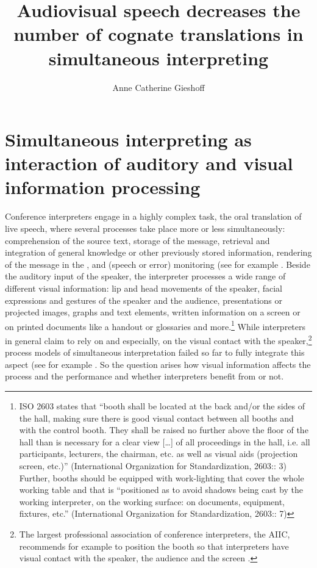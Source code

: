 \documentclass[output=paper]{LSP/langsci}
\title{Audiovisual speech decreases the number of cognate translations in simultaneous interpreting}
\author{Anne Catherine Gieshoff\affiliation{FTSK Germersheim, Johannes-Gutenberg-Universtität Mainz}}
\begin{document}
\section{Simultaneous interpreting as interaction of auditory and visual information processing}
\largerpage%
Conference interpreters engage in a highly complex task, the oral translation of live speech, where several processes take place more or less simultaneously: comprehension of the source text, storage of the message, retrieval and integration of general knowledge or other previously stored information, rendering of the message in the , and (speech or error) monitoring (see for example \citealt{Seeber2012, Gile2009, Setton1999, Gerver1975}. Beside the auditory input of the speaker, the interpreter processes a wide range of different visual information: lip and head movements of the speaker, facial expressions and gestures of the speaker and the audience, presentations or projected images, graphs and text elements, written information on a screen or on printed documents like a handout or glossaries and more.\footnote{ISO 2603 states that ``booth shall be located at the back and/or the sides of the hall, making sure there is good visual contact between all booths and with the control booth. They shall be raised no further above the floor of the hall than is necessary for a clear view [\ldots] of all proceedings in the hall, i.e. all participants, lecturers, the chairman, etc. as well as visual aids (projection screen, etc.)'' (International Organization for Standardization, 2603:\citeyear{ISO2603}: 3) Further, booths should be equipped with work-lighting that cover the whole working table and that is ``positioned as to avoid shadows being cast by the working interpreter, on the working surface: on documents, equipment, fixtures, etc.''  (International Organization for Standardization, 2603:\citeyear{ISO2603}: 7)} While interpreters in general claim to rely on  and especially, on the visual contact with the speaker,\footnote{The largest professional association of conference interpreters, the AIIC, recommends for example to position the booth so that interpreters have visual contact with the speaker, the audience and the screen \citep{AIIC2016}.} process models of simultaneous interpretation failed so far to fully integrate this aspect (see for example \citealt{Seeber2012, Gile2009, Gerver1975}. So the question arises how visual information affects the  process and the  performance and whether interpreters benefit from  or not.
\end{document}
